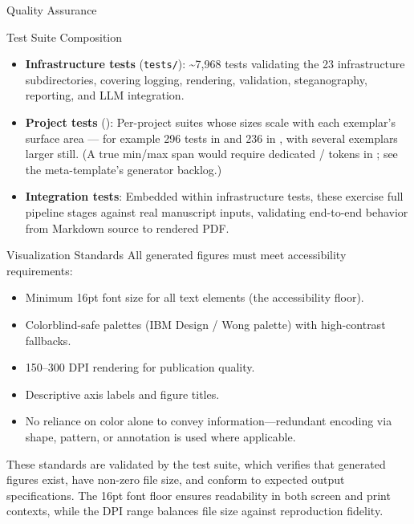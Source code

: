 \documentclass[
  ignorenonframetext,
]{beamer}
\providecommand{\tightlist}{%
  \setlength{\itemsep}{0pt}\setlength{\parskip}{0pt}}
\begin{document}
\begin{frame}{Quality Assurance}
\begin{block}{Test Suite Composition}
\begin{itemize}
\tightlist
\item
  \textbf{Infrastructure tests} (\texttt{tests/}): \textasciitilde7,968
  tests validating the 23 infrastructure subdirectories, covering
  logging, rendering, validation, steganography, reporting, and LLM
  integration.
\item
  \textbf{Project tests} (): Per-project
  suites whose sizes scale with each exemplar's surface area --- for
  example 296 tests in  and 236
  in , with several exemplars larger
  still. (A true min/max span would require dedicated
  /
  tokens in ; see the
  meta-template's generator backlog.)
\item
  \textbf{Integration tests}: Embedded within infrastructure tests,
  these exercise full pipeline stages against real manuscript inputs,
  validating end-to-end behavior from Markdown source to rendered PDF.
\end{itemize}
\end{block}

\begin{block}{Visualization Standards}
\protect{}\label{visualization-standards}
All generated figures must meet accessibility requirements:

\begin{itemize}
\tightlist
\item
  Minimum 16pt font size for all text elements (the accessibility
  floor).
\item
  Colorblind-safe palettes (IBM Design / Wong palette) with
  high-contrast fallbacks.
\item
  150--300 DPI rendering for publication quality.
\item
  Descriptive axis labels and figure titles.
\item
  No reliance on color alone to convey information---redundant encoding
  via shape, pattern, or annotation is used where applicable.
\end{itemize}

These standards are validated by the 
test suite, which verifies that generated figures exist, have non-zero
file size, and conform to expected output specifications. The 16pt font
floor ensures readability in both screen and print contexts, while the
DPI range balances file size against reproduction fidelity.
\end{block}
\end{frame}
\end{document}
